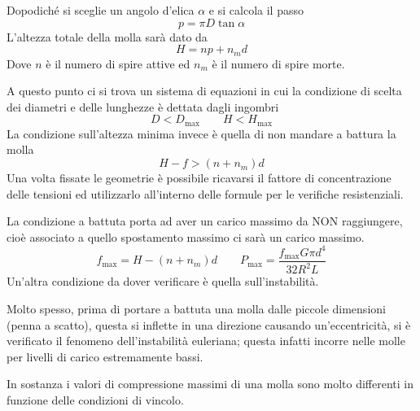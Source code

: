 \documentclass[a4paper, 15pt]{article}
\begin{document}
\begin{adjustwidth}{2in}{}
Dopodiché si sceglie un angolo d'elica $\alpha$ e si calcola il passo
\[p = \pi D\tan\alpha\]
L'altezza totale della molla sarà dato da 
\[H = np + n_md\]
Dove $n$ è il numero di spire attive ed $n_m$ è il numero di spire morte. 

A questo punto ci si trova un sistema di equazioni in cui la condizione di scelta dei diametri e delle lunghezze è dettata dagli ingombri 
\[D<D_{\max} \qquad H<H_{\max}\]
La condizione sull'altezza minima invece è quella di non mandare a battura la molla
\[H-f >(n+n_m)d\]
Una volta fissate le geometrie è possibile ricavarsi il fattore di concentrazione delle tensioni ed utilizzarlo all'interno delle formule per le verifiche resistenziali. \newline 

La condizione a battuta porta ad aver un carico massimo  da NON raggiungere, cioè associato a quello spostamento massimo ci sarà un carico massimo. 
\[f_{\max} = H - (n+n_m)d \qquad P_{\max} = \dfrac{f_{\max}G\pi d^4}{32R^2L}\]
Un'altra condizione da dover verificare è quella sull'instabilità. 

Molto spesso, prima di portare a battuta una molla dalle piccole dimensioni (penna a scatto), questa si inflette in una direzione causando un'eccentricità, si è verificato il fenomeno dell'instabilità euleriana; questa infatti incorre nelle molle per livelli di carico estremamente bassi. 

In sostanza i valori di compressione massimi di una molla sono molto differenti in funzione delle condizioni di vincolo. 
\end{adjustwidth}
\newpage
\end{document}
